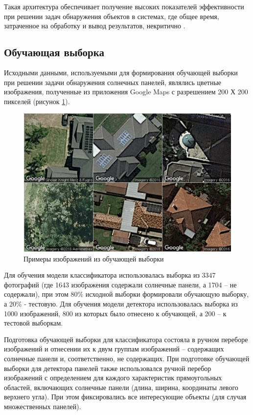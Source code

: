 Такая архитектура обеспечивает получение высоких показателей эффективности при решении задач обнаружения объектов в системах, где общее время, затраченное на обработку и вывод результатов, некритично \cite[c.~29]{Golovko2018}.

\subsection{Обучающая выборка}
Исходными данными, используемыми для формирования обучающей выборки при решении задачи обнаружения солнечных панелей, являлись цветные изображения, полученные из приложения Google Maps с разрешением 200 Х 200 пикселей (рисунок \ref{fig:google_maps}).

\begin{figure}[ht]
	\centering
	\includegraphics[width=12cm]{man-source/images/ch4/pic4-17.png}
	\caption{Примеры изображений из обучающей выборки}
	\label{fig:google_maps}
\end{figure}

Для обучения модели классификатора использовалась выборка из 3347 фотографий (где 1643 изображения содержали солнечные панели, а 1704 -- не содержали), при этом 80\% исходной выборки формировали обучающую выборку, а 20\% - тестовую. Для обучения модели детектора использовалась выборка из 1000 изображений, 800 из которых было отнесено к обучающей, а 200 -- к тестовой выборкам.

Подготовка обучающей выборки для классификатора состояла в ручном переборе изображений и отнесении их к двум группам изображений -- содержащих солнечные панели и, соответственно, не содержащих. При подготовке обучающей выборки для детектора панелей также использовался ручной перебор изображений с определением для каждого характеристик прямоугольных областей, включающих солнечные панели (длина, ширина, координаты левого верхнего угла). При этом фиксировались все интересующие объекты (для случая множественных панелей). 

